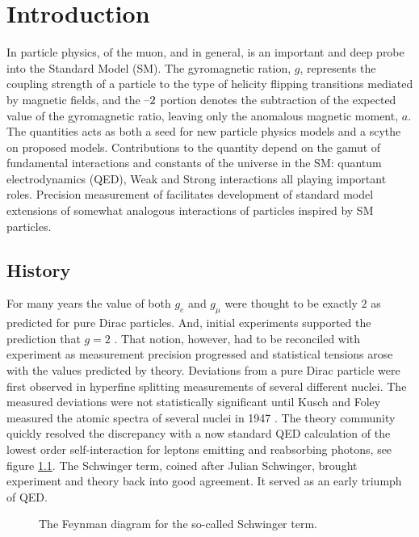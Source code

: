 \chapter {Introduction}

In particle physics, \gmtwo of the muon, and \gmtwo in general, is an important and deep probe into the Standard Model (SM). The gyromagnetic ration, $g$, represents the coupling strength of a particle to the type of helicity flipping transitions mediated by magnetic fields, and the $\hbox{--}2$ portion denotes the subtraction of the expected value of the gyromagnetic ratio, leaving only the anomalous magnetic moment, $a$.  The quantities acts as both a seed for new particle physics models and a scythe on proposed models.   Contributions to the quantity depend on the gamut of fundamental interactions and constants of the universe in the SM: quantum electrodynamics (QED), Weak and Strong interactions all playing important roles.  Precision measurement of \gmtwo facilitates development of standard model extensions of somewhat analogous interactions of particles inspired by SM particles. 

\section{History}

For many years the value of both $g_e$ and $g_\mu$ were thought to be exactly $2$ as predicted for pure Dirac particles\cite{the-muon-g-2}. And, initial experiments supported the prediction that $g = 2$ . That notion, however, had to be reconciled with experiment as measurement precision progressed and statistical tensions arose with the values predicted by theory.  Deviations from a pure Dirac particle were first observed in hyperfine splitting measurements of several different nuclei.  The measured deviations were not statistically significant until Kusch and Foley measured the atomic spectra of several nuclei in 1947 \cite{kusch-foley}.  The theory community quickly resolved the discrepancy with a now standard QED calculation of the lowest order self-interaction for leptons emitting and reabsorbing photons, see figure \ref{fig:schwinger-diagram}.  The Schwinger term, coined after Julian Schwinger, brought experiment and theory back into good agreement.  It served as an early triumph of QED. 

\begin{figure}
\centering
{}
\label{fig:schwinger-diagram}
\caption{The Feynman diagram for the so-called Schwinger term.}
\end{figure}


